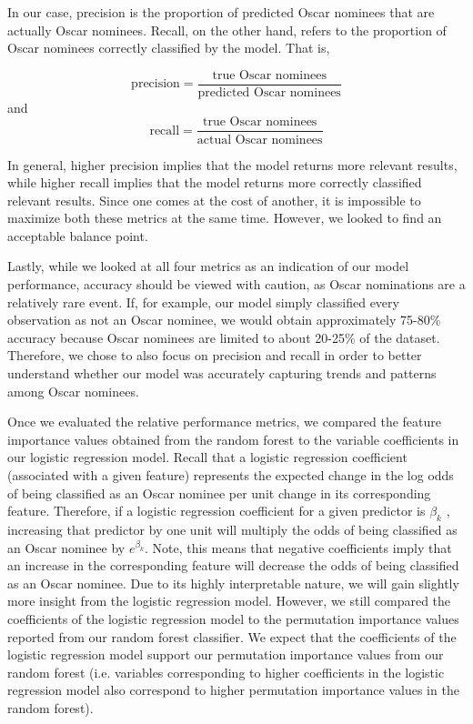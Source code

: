 \documentclass[10pt]{article}
\begin{document}
In our case, precision is the proportion of predicted Oscar nominees that are actually Oscar nominees. Recall, on the other hand, refers to the proportion of Oscar nominees correctly classified by the model. That is, 

$$\text{precision} = \frac{\text{true Oscar nominees}}{\text{predicted Oscar nominees}}$$
and 
$$\text{recall} = \frac{\text{true Oscar nominees}}{\text{actual Oscar nominees}}$$

In general, higher precision implies that the model returns more relevant results, while higher recall implies that the model returns more correctly classified relevant results. Since one comes at the cost of another, it is impossible to maximize both these metrics at the same time. However, we looked to find an acceptable balance point. 

Lastly, while we looked at all four metrics as an indication of our model performance, accuracy should be viewed with caution, as Oscar nominations are a relatively rare event. If, for example, our model simply classified every observation as not an Oscar nominee, we would obtain approximately 75-80\% accuracy because Oscar nominees are limited to about 20-25\% of the dataset. Therefore, we chose to also focus on precision and recall in order to better understand whether our model was accurately capturing trends and patterns among Oscar nominees.

Once we evaluated the relative performance metrics, we compared the feature importance values obtained from the random forest to the variable coefficients in our logistic regression model. Recall that a logistic regression coefficient (associated with a given feature) represents the expected change in the log odds of being classified as an Oscar nominee per unit change in its corresponding feature. Therefore, if a logistic regression coefficient for a given predictor is $\beta_k$ , increasing that predictor by one unit will multiply the odds of being classified as an Oscar nominee by $e^{\beta_k}$. Note, this means that negative coefficients imply that an increase in the corresponding feature will decrease the odds of being classified as an Oscar nominee. Due to its highly interpretable nature, we will gain slightly more insight from the logistic regression model. However, we still compared the coefficients of the logistic regression model to the permutation importance values reported from our random forest classifier. We expect that the coefficients of the logistic regression model support our permutation importance values from our random forest (i.e. variables corresponding to higher coefficients in the logistic regression model also correspond to higher permutation importance values in the random forest).  
\end{document}

